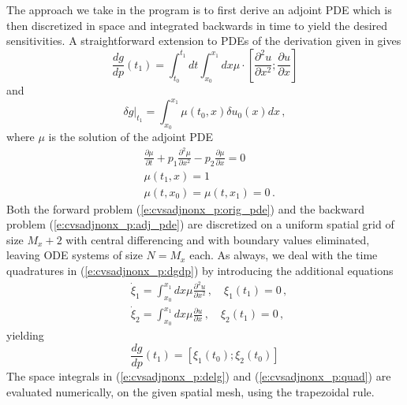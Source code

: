 The approach we take in the program  is to first derive an 
adjoint PDE which is then discretized in space and integrated backwards
in time to yield the desired sensitivities. A straightforward extension 
to PDEs of the derivation given in  gives
\begin{equation}\label{e:cvsadjnonx_p:dgdp}
  \frac{dg}{dp} (t_1) = \int_{t_0}^{t_1} dt 
  \int_{x_0}^{x_1} dx \mu \cdot 
  \left[
    \frac{\partial^2 u}{\partial x^2} ;
    \frac{\partial u}{\partial x}
  \right ]
\end{equation}
and
\begin{equation}\label{e:cvsadjnonx_p:delg}
  \delta g |_{t_1} = \int_{x_0}^{x_1} \mu(t_0,x) \delta u_0(x) dx \, , 
\end{equation}
where $\mu$ is the solution of the adjoint PDE
\begin{equation}\label{e:cvsadjnonx_p:adj_pde}
  \begin{split}
    & \frac{\partial \mu}{\partial t} + p_1 \frac{\partial^2 \mu}{\partial x^2} 
    - p_2 \frac{\partial \mu}{\partial x} = 0 \\
    & \mu(t_1 , x) = 1 \\
    & \mu(t , x_0) = \mu( t , x_1 ) = 0 \, .
  \end{split}
\end{equation}
Both the forward problem (\ref{e:cvsadjnonx_p:orig_pde}) and the backward problem 
(\ref{e:cvsadjnonx_p:adj_pde}) are discretized on a uniform spatial grid of size
$M_x + 2$ with central differencing and with boundary values eliminated,
leaving ODE systems of size $N = M_x$ each. 
As always, we deal with the time quadratures in (\ref{e:cvsadjnonx_p:dgdp}) by introducing
the additional equations
\begin{equation}\label{e:cvsadjnonx_p:quad}
  \begin{split}
    &{\dot\xi}_1 = \int_{x_0}^{x_1} dx \mu \frac{\partial^2 u}{\partial x^2} \, , \quad
    \xi_1(t_1) = 0 \, , \\
    &{\dot\xi}_2 = \int_{x_0}^{x_1} dx \mu \frac{\partial u}{\partial x} \, , \quad
    \xi_2(t_1) = 0 \, ,
  \end{split}
\end{equation}
yielding
\begin{equation*}
  \frac{dg}{dp} (t_1) = \left[ \xi_1(t_0) ; \xi_2(t_0) \right ]
\end{equation*}
The space integrals in (\ref{e:cvsadjnonx_p:delg}) and (\ref{e:cvsadjnonx_p:quad}) are
evaluated numerically, on the given spatial mesh, using the trapezoidal rule.

